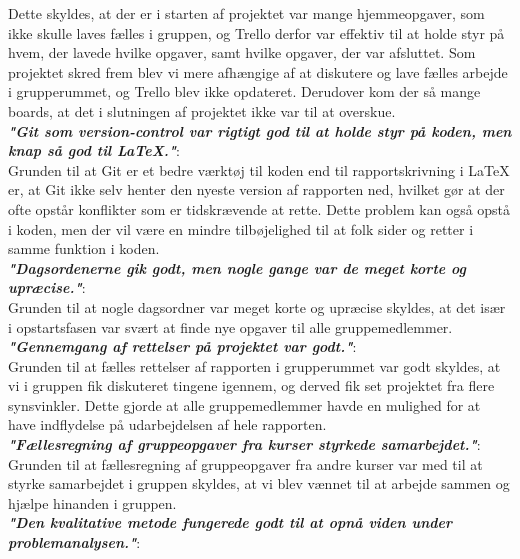 \documentclass[oneside,a4paper,titlepage]{article}
\begin{document}
Dette skyldes, at der er i starten af projektet var mange hjemmeopgaver, som ikke skulle laves fælles i gruppen, og Trello derfor var effektiv til at holde styr på hvem, der lavede hvilke opgaver, samt hvilke opgaver, der var afsluttet. Som projektet skred frem blev vi mere afhængige af at diskutere og lave fælles arbejde i grupperummet, og Trello blev ikke opdateret. Derudover kom der så mange boards, at det i slutningen af projektet ikke var til at overskue. \\

\textbf{\textit{"Git som version-control var rigtigt god til at holde styr på koden, men knap så god til LaTeX."}}: \\

Grunden til at Git er et bedre værktøj til koden end til rapportskrivning i LaTeX er, at Git ikke selv henter den nyeste version af rapporten ned, hvilket gør at der ofte opstår konflikter som er tidskrævende at rette. Dette problem kan også opstå i koden, men der vil være en mindre tilbøjelighed til at folk sider og retter i samme funktion i koden.  \\

\textbf{\textit{"Dagsordenerne gik godt, men nogle gange var de meget korte og upræcise."}}: \\

Grunden til at nogle dagsordner var meget korte og upræcise skyldes, at det især i opstartsfasen var svært at finde nye opgaver til alle gruppemedlemmer. \\

\textbf{\textit{"Gennemgang af rettelser på projektet var godt."}}: \\

Grunden til at fælles rettelser af rapporten i grupperummet var godt skyldes, at vi i gruppen fik diskuteret tingene igennem, og derved fik set projektet fra flere synsvinkler. Dette gjorde at alle gruppemedlemmer havde en mulighed for at have indflydelse på udarbejdelsen af hele rapporten.  \\

\textbf{\textit{"Fællesregning af gruppeopgaver fra kurser styrkede samarbejdet."}}: \\

Grunden til at fællesregning af gruppeopgaver fra andre kurser var med til at styrke samarbejdet i gruppen skyldes, at vi blev vænnet til at arbejde sammen og hjælpe hinanden i gruppen.  \\

\textbf{\textit{"Den kvalitative metode fungerede godt til at opnå viden under problemanalysen."}}: \\
\end{document}
